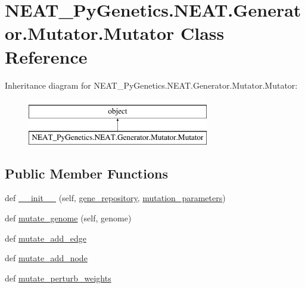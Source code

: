 \hypertarget{classNEAT__PyGenetics_1_1NEAT_1_1Generator_1_1Mutator_1_1Mutator}{}\section{N\+E\+A\+T\+\_\+\+Py\+Genetics.\+N\+E\+A\+T.\+Generator.\+Mutator.\+Mutator Class Reference}
\label{classNEAT__PyGenetics_1_1NEAT_1_1Generator_1_1Mutator_1_1Mutator}
Inheritance diagram for N\+E\+A\+T\+\_\+\+Py\+Genetics.\+N\+E\+A\+T.\+Generator.\+Mutator.\+Mutator\+:\begin{figure}[H]
\begin{center}
\leavevmode
\includegraphics[height=2.000000cm]{classNEAT__PyGenetics_1_1NEAT_1_1Generator_1_1Mutator_1_1Mutator}
\end{center}
\end{figure}
\subsection*{Public Member Functions}
\begin{DoxyCompactItemize}
\item 
def \hyperlink{classNEAT__PyGenetics_1_1NEAT_1_1Generator_1_1Mutator_1_1Mutator_aef75e9ceb50c5d6df86ab49132a1fe84}{\+\_\+\+\_\+init\+\_\+\+\_\+} (self, \hyperlink{classNEAT__PyGenetics_1_1NEAT_1_1Generator_1_1Mutator_1_1Mutator_afa98da8eee10b2a4e9c653238dbbbe2c}{gene\+\_\+repository}, \hyperlink{classNEAT__PyGenetics_1_1NEAT_1_1Generator_1_1Mutator_1_1Mutator_a3339255b05437da752358f068835bc26}{mutation\+\_\+parameters})
\item 
def \hyperlink{classNEAT__PyGenetics_1_1NEAT_1_1Generator_1_1Mutator_1_1Mutator_aa805f3b8374dcf45ab4406f48bf145d5}{mutate\+\_\+genome} (self, genome)
\item 
def \hyperlink{classNEAT__PyGenetics_1_1NEAT_1_1Generator_1_1Mutator_1_1Mutator_aaee3498341c20339761db1301af7f341}{mutate\+\_\+add\+\_\+edge}
\item 
def \hyperlink{classNEAT__PyGenetics_1_1NEAT_1_1Generator_1_1Mutator_1_1Mutator_afeabd93fc71a47574e11dd8ac86b1cc2}{mutate\+\_\+add\+\_\+node}
\item 
def \hyperlink{classNEAT__PyGenetics_1_1NEAT_1_1Generator_1_1Mutator_1_1Mutator_aecb97c840811304711e07fe159b0c4bd}{mutate\+\_\+perturb\+\_\+weights}
\end{DoxyCompactItemize}
